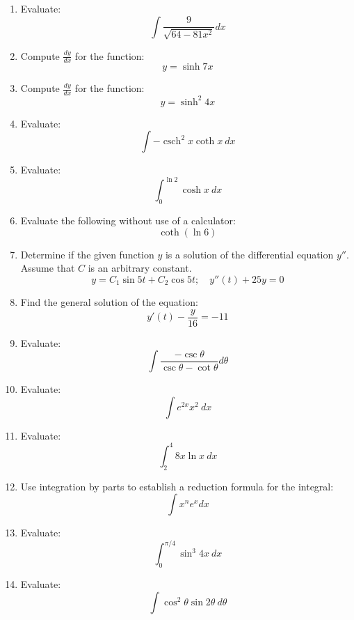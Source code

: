 \documentclass[fleqn]{article}
\DeclareMathOperator{\csch}{csch}
\begin{document}
    \begin{enumerate}
    \item Evaluate:
\[\int\frac{9}{\sqrt{64-81x^2}}dx\]

\item Compute \(\frac{dy}{dx}\) for the function:
\[y=\sinh 7x\]

\item Compute \(\frac{dy}{dx}\) for the function:
\[y=\sinh^2 4x\]

\item Evaluate:
\[\int-\csch^2 x\coth x\ dx\]

\item Evaluate:
\[\int_0^{\ln 2}\cosh x\ dx\]

\item Evaluate the following without use of a calculator:
\[\coth(\ln 6)\]

\item Determine if the given function \(y\) is a solution of the differential equation
\(y''\). Assume that \(C\) is an arbitrary constant.
\[y=C_1\sin 5t+C_2\cos 5t;\quad y''(t)+25y=0\]

\item Find the general solution of the equation:
\[y'(t)-\frac{y}{16}=-11\]

\item Evaluate:
\[\int\frac{-\csc\theta}{\csc\theta-\cot\theta}d\theta\]

\item Evaluate:
\[\int e^{2x}x^2\ dx\]

\item Evaluate:
\[\int_2^4 8x\ln x\ dx\]

\item Use integration by parts to establish a reduction formula for the integral:
\[\int x^n e^x dx\]

\item Evaluate:
\[\int_0^{\pi/4}\sin^3 4x\ dx\]

\item Evaluate:
\[\int\cos^2\theta\sin 2\theta\ d\theta\]

\end{enumerate}
    
\end{document}
